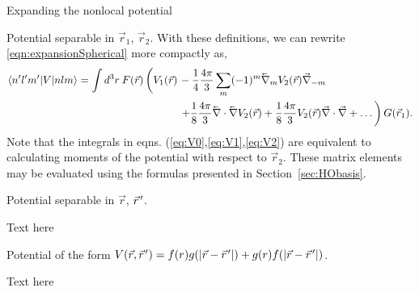 \begin{section}{Expanding the nonlocal potential}
\begin{subsection}{Potential separable in $\vec{r}_1$, $\vec{r}_2$.\label{subsec:form1}}
With these definitions, we can rewrite \eqref{eqn:expansionSpherical} more compactly as,
\begin{equation}\label{eqn:expansion2}
\begin{split}
\braket{n' l' m'| V | n l m} =  \int d^3r\: F(\vec{r})\left( \vphantom{\frac{1}{2}}V_1(\vec{r})\right.&-\frac{1}{4}\frac{4\pi}{3}\sum_m(-1)^m \lvec{\nabla}_{m}  V_2(\vec{r}) \vec{\nabla}_{-m} \\
&\left.+\frac{1}{8}\frac{4\pi}{3}\lvec{\nabla}\cdot\lvec{\nabla} V_2(\vec{r})+\frac{1}{8}\frac{4\pi}{3}V_2(\vec{r})\vec{\nabla}\cdot\vec{\nabla}+\dots\right) G(\vec{r}_1).
\end{split}
\end{equation}
Note that the integrals in eqns. (\ref{eq:V0},\ref{eq:V1},\ref{eq:V2})  are equivalent to calculating moments of the potential with respect to $\vec{r}_2$. These matrix elements may be evaluated using the formulas presented in Section~\ref{sec:HObasis}.

\end{subsection}

\begin{subsection}{Potential separable in $\vec{r}$, $\vec{r}\mkern2mu'$.}

Text here

\end{subsection}

\begin{subsection}{Potential of the form $V(\vec{r},\vec{r}\mkern2mu')=f(r)g(|\vec{r}-\vec{r}\mkern2mu' |)+g(r)f(|\vec{r}-\vec{r}\mkern2mu' |)$.}

Text here

\end{subsection}

\end{section}
